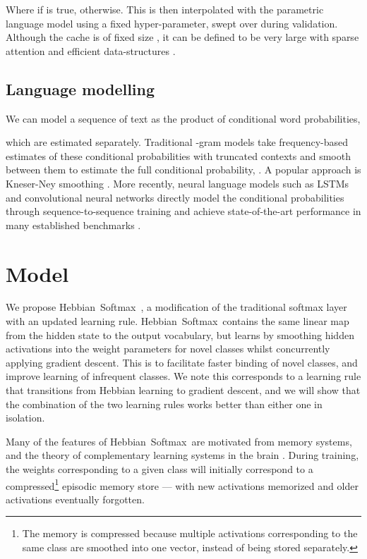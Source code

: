\documentclass{article} \usepackage{hyperref}
\newcommand{\model}{\hbox{Hebbian Softmax }}
\begin{document}
Where  if  is true,  otherwise. This is then interpolated with the parametric language model using a fixed hyper-parameter, swept over during validation. Although the cache is of fixed size , it can be defined to be very large with sparse attention and efficient data-structures \cite{rae2016scaling, kaiser2017learning, grave2017unbounded}.

\subsection{Language modelling}
We can model a sequence of text as the product of conditional word probabilities,

which are estimated separately. Traditional -gram models take frequency-based estimates of these conditional probabilities with truncated contexts  and smooth between them to estimate the full conditional probability, . A popular approach is Kneser-Ney smoothing \citep{kneser1995improved}. More recently, neural language models such as LSTMs and convolutional neural networks directly model the conditional probabilities through sequence-to-sequence training and achieve state-of-the-art performance in many established benchmarks \citep{collobert2008unified, sundermeyer2012lstm, kalchbrenner2014convolutional, jozefowicz2016exploring, dauphin2016language, melis2017state}.

\section{Model}
\label{sec:model}

We propose \model \!, a modification of the traditional softmax layer with an updated learning rule. \model contains the same linear map from the hidden state to the output vocabulary, but learns by smoothing hidden activations into the weight parameters for novel classes whilst concurrently applying gradient descent. This is to facilitate faster binding of novel classes, and improve learning of infrequent classes. We note this corresponds to a learning rule that transitions from Hebbian learning to gradient descent, and we will show that the combination of the two learning rules works better than either one in isolation.

Many of the features of \model are motivated from memory systems, and the theory of complementary learning systems in the brain \cite{mcclelland1995there}. During training, the weights corresponding to a given class will initially correspond to a compressed\footnote{The memory is compressed because multiple activations corresponding to the same class are smoothed into one vector, instead of being stored separately.} episodic memory store --- with new activations memorized and older activations eventually forgotten. 
\end{document}

